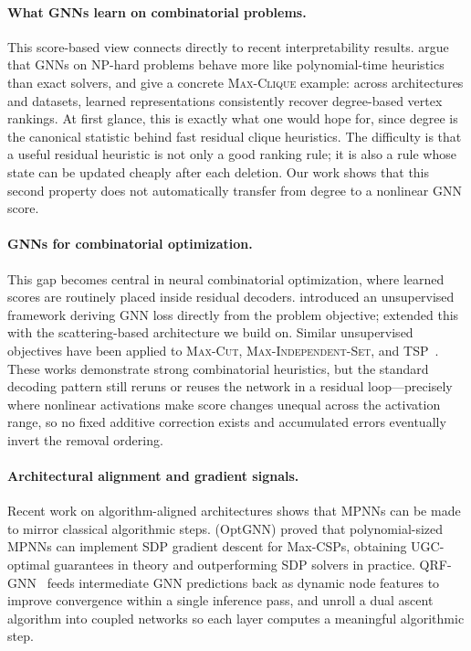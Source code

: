 \documentclass[11pt]{article}
\theoremstyle{plain}
\theoremstyle{remark}
\theoremstyle{plain}
\begin{document}
\paragraph{What GNNs learn on combinatorial problems.}
This score-based view connects directly to recent interpretability results.
\citet{cappart2023} argue that GNNs on NP-hard problems behave more like
polynomial-time heuristics than exact solvers, and \citet{shoham2026ltr} give a
concrete \textsc{Max-Clique} example: across architectures and datasets, learned
representations consistently recover degree-based vertex rankings. At first glance,
this is exactly what one would hope for, since degree is the canonical statistic
behind fast residual clique heuristics. The difficulty is that a useful residual
heuristic is not only a good ranking rule; it is also a rule whose state can be
updated cheaply after each deletion. Our work shows that this second property does
not automatically transfer from degree to a nonlinear GNN score.

\paragraph{GNNs for combinatorial optimization.}
This gap becomes central in neural combinatorial optimization, where learned scores
are routinely placed inside residual decoders. \citet{karalias2020} introduced an
unsupervised framework deriving GNN loss directly from the problem objective;
\citet{min2022} extended this with the scattering-based architecture we build on.
Similar unsupervised objectives have been applied to \textsc{Max-Cut},
\textsc{Max-Independent-Set}, and \textsc{TSP}~\citep{schuetz2022,garmendia2024}.
These works demonstrate strong combinatorial heuristics, but the standard decoding
pattern still reruns or reuses the network in a residual loop---precisely where
nonlinear activations make score changes unequal across the activation range, so
no fixed additive correction exists and accumulated errors eventually invert the
removal ordering.

\paragraph{Architectural alignment and gradient signals.}
Recent work on algorithm-aligned architectures shows that MPNNs can be made to
mirror classical algorithmic steps. \citet{yau2023} (OptGNN) proved that
polynomial-sized MPNNs can implement SDP gradient descent for Max-CSPs, obtaining
UGC-optimal guarantees in theory and outperforming SDP solvers in practice.
QRF-GNN~\citep{gaile2024} feeds intermediate GNN predictions back as dynamic node
features to improve convergence within a single inference pass, and \citet{hadou2024}
unroll a dual ascent algorithm into coupled networks so each layer computes a
meaningful algorithmic step.
\end{document}
